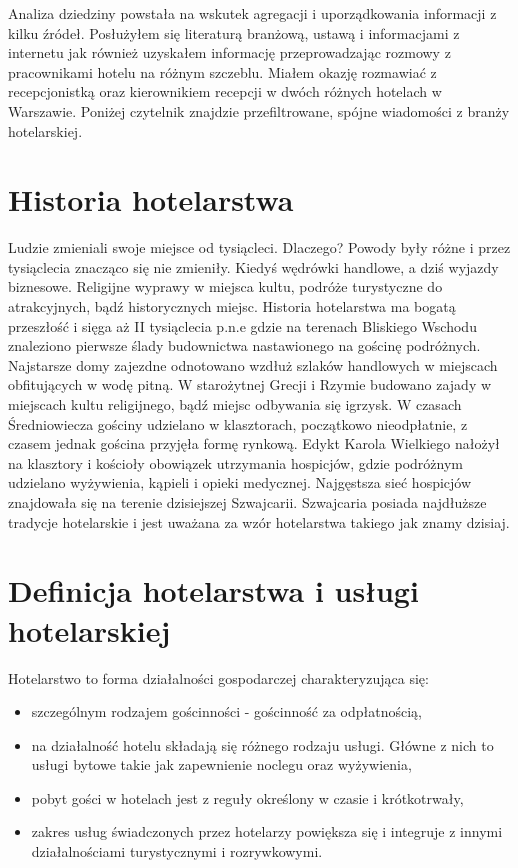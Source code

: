 \documentclass[a4paper,onecolumn,oneside,11pt,wide,floatssmall]{mwrep}
\theoremstyle{definition}
\theoremstyle{plain}%
\theoremstyle{remark}
\begin{document}
Analiza dziedziny powstała na wskutek agregacji i uporządkowania informacji z kilku źródeł. Posłużyłem się literaturą branżową, ustawą i informacjami z internetu jak również uzyskałem informację przeprowadzając rozmowy z pracownikami hotelu na różnym szczeblu. Miałem okazję rozmawiać z recepcjonistką oraz kierownikiem recepcji w dwóch różnych hotelach w Warszawie. Poniżej czytelnik znajdzie przefiltrowane, spójne wiadomości z branży hotelarskiej.


\section{Historia hotelarstwa} 

Ludzie zmieniali swoje miejsce od tysiącleci. Dlaczego? Powody były różne i przez tysiąclecia znacząco się nie zmieniły. Kiedyś wędrówki handlowe, a dziś wyjazdy biznesowe. Religijne wyprawy w miejsca kultu, podróże turystyczne do atrakcyjnych, bądź historycznych miejsc.     Historia hotelarstwa ma bogatą przeszłość i sięga aż II tysiąclecia p.n.e gdzie na terenach Bliskiego Wschodu znaleziono pierwsze ślady budownictwa nastawionego na gościnę podróżnych. Najstarsze domy zajezdne odnotowano wzdłuż szlaków handlowych w miejscach obfitujących w wodę pitną. W starożytnej Grecji i Rzymie budowano zajady w miejscach kultu religijnego, bądź miejsc odbywania się igrzysk. W czasach Średniowiecza gościny udzielano w klasztorach, początkowo nieodpłatnie, z czasem jednak gościna przyjęła formę rynkową. Edykt Karola Wielkiego nałożył na klasztory i kościoły obowiązek utrzymania hospicjów, gdzie podróżnym udzielano wyżywienia, kąpieli i opieki medycznej. Najgęstsza sieć hospicjów znajdowała się na terenie dzisiejszej Szwajcarii. Szwajcaria posiada najdłuższe tradycje hotelarskie i jest uważana za wzór hotelarstwa takiego jak znamy dzisiaj.


\section{Definicja hotelarstwa i usługi hotelarskiej}

Hotelarstwo to forma działalności gospodarczej charakteryzująca się:
\begin{itemize} 
  \item szczególnym rodzajem gościnności - gościnność za odpłatnością,
  \item na działalność hotelu składają się różnego rodzaju usługi. Główne z nich to usługi bytowe takie jak zapewnienie noclegu oraz wyżywienia,
  \item pobyt gości w hotelach jest z reguły określony w czasie i krótkotrwały,
  \item zakres usług świadczonych przez hotelarzy powiększa się i integruje z innymi działalnościami turystycznymi i rozrywkowymi.
\end{itemize}
\end{document}
